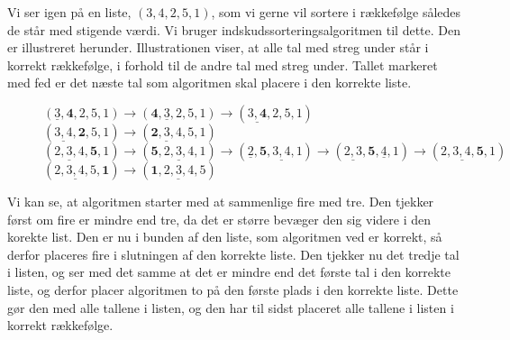 \begin{exmp}
Vi ser igen på en liste, $(3,4,2,5,1)$, som vi gerne vil sortere i rækkefølge således de står med stigende værdi. Vi bruger indskudssorteringsalgoritmen til dette. Den er illustreret herunder. Illustrationen viser, at alle tal med streg under står i korrekt rækkefølge, i forhold til de andre tal med streg under. Tallet markeret med fed er det næste tal som algoritmen skal placere i den korrekte liste.

\begin{figure}[H]
\label{fig:indskud}
	\begin{flushleft}
	$(\underline{3},\textbf{4},2,5,1) \rightarrow (\textbf{4}, \underline{3},2,5,1)\rightarrow (\underline{3,\textbf{4}},2,5,1)$ \\
	$(\underline{3,4},\textbf{2},5,1) \rightarrow (\underline{\textbf{2},3,4},5,1) $\\
	$(\underline{2,3,4},\textbf{5},1) \rightarrow (\textbf{5},\underline{2,3,4},1) \rightarrow (\underline{2}, \textbf{5},\underline{3,4},1) \rightarrow (\underline{2,3}, \textbf{5}, \underline{4},1) \rightarrow (\underline{2,3,4,\textbf{5}},1) $ \\
	$(\underline{2,3,4,5},\textbf{1}) \rightarrow (\underline{\textbf{1},2,3,4,5}) $\\
 	\end{flushleft}
\end{figure}

Vi kan se, at algoritmen starter med at sammenlige fire med tre. Den tjekker først om fire er mindre end tre, da det er større bevæger den sig videre i den korekte list. Den er nu i bunden af den liste, som algoritmen ved er korrekt, så derfor placeres fire i slutningen af den korrekte liste. Den tjekker nu det tredje tal i listen, og ser med det samme at det er mindre end det første tal i den korrekte liste, og derfor placer algoritmen to på den første plads i den korrekte liste. Dette gør den med alle tallene i listen, og den har til sidst placeret alle tallene i listen i korrekt rækkefølge.


\end{exmp}